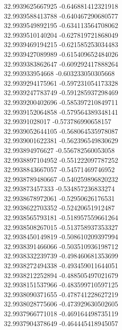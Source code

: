 {32.9939625667925	-0.646881412321918\\
32.9939588413788	-0.640467290680577\\
32.9939549892195	-0.634113564708062\\
32.9939510140204	-0.627819721868049\\
32.9939469194215	-0.621585253034483\\
32.9939427089989	-0.615409652484026\\
32.9939383862647	-0.609292417888264\\
32.993933954668	-0.603233050305668\\
32.9939294175961	-0.597231054173328\\
32.9939247783749	-0.591285937298469\\
32.9939200402696	-0.585397210849711\\
32.9939152064858	-0.579564389348141\\
32.99391028017	-0.573786990658157\\
32.9939052644105	-0.568064535978087\\
32.9939001622381	-0.562396549830629\\
32.993894976627	-0.556782560053058\\
32.9938897104952	-0.551222097787252\\
32.9938843667057	-0.54571469746952\\
32.9938789480667	-0.540259896820232\\
32.993873457333	-0.534857236833274\\
32.9938678972061	-0.52950626176531\\
32.9938622703352	-0.52420651912487\\
32.9938565793181	-0.518957559661264\\
32.9938508267015	-0.513758937353327\\
32.9938450149819	-0.508610209397994\\
32.9938391466066	-0.503510936198712\\
32.9938332239739	-0.498460681353699\\
32.9938272494338	-0.493459011644051\\
32.9938212252894	-0.488505497021679\\
32.9938151537966	-0.483599710597125\\
32.9938090371655	-0.478741228627219\\
32.9938028775606	-0.473929630502605\\
32.9937966771018	-0.469164498735119\\
32.9937904378649	-0.464445418945057\\
}

